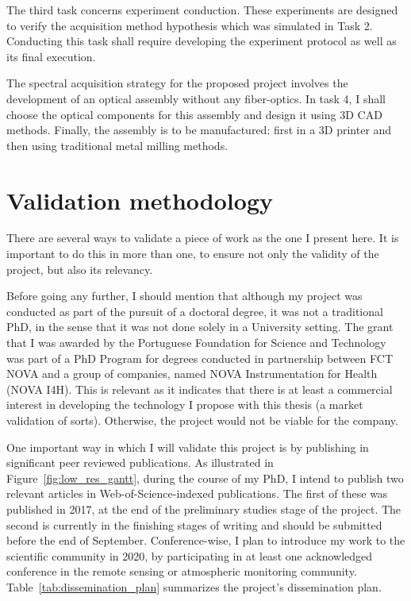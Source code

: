 The third task concerns experiment conduction. These experiments are
designed to verify the acquisition method hypothesis which was simulated
in Task 2. Conducting this task shall require developing the experiment
protocol as well as its final execution.

The spectral acquisition strategy for the proposed project involves the
development of an optical assembly without any fiber-optics. In task 4,
I shall choose the optical components for this assembly and design it
using 3D CAD methods. Finally, the assembly is to be manufactured: first
in a 3D printer and then using traditional metal milling methods.


\section{Validation methodology}%
\label{sec:validation_methodology}

There are several ways to validate a piece of work as the one I present
here. It is important to do this in more than one, to ensure not only
the validity of the project, but also its relevancy.

Before going any further, I should mention that although my project was
conducted as part of the pursuit of a doctoral degree, it was not a
traditional PhD, in the sense that it was not done solely in a
University setting. The grant that I was awarded by the Portuguese
Foundation for Science and Technology was part of a PhD Program for
degrees conducted in partnership between FCT NOVA and a group of
companies, named NOVA Instrumentation for Health (NOVA I4H). This is
relevant as it indicates that there is at least a commercial interest in
developing the technology I propose with this thesis (a market
validation of sorts). Otherwise, the project would not be viable for the
company.

One important way in which I will validate this project is by publishing
in significant peer reviewed publications. As illustrated in
Figure~\ref{fig:low_res_gantt}, during the course of my PhD, I intend to
publish two relevant articles in Web-of-Science-indexed publications.
The first of these was published in 2017, at the end of the preliminary
studies stage of the project. The second is currently in the finishing
stages of writing and should be submitted before the end of September.
Conference-wise, I plan to introduce my work to the scientific community
in 2020, by participating in at least one acknowledged conference in the
remote sensing or atmospheric monitoring community.
Table~\ref{tab:dissemination_plan} summarizes the project's
dissemination plan.

